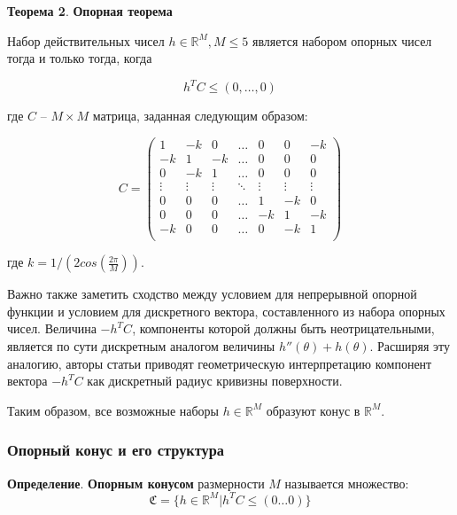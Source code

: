 \documentclass[a4paper,12pt, titlepage]{article}
\begin{document}
\begin{flushleft}
 \textbf{Теорема 2}. \textbf{Опорная теорема}

  Набор действительных чисел $h \in \mathbb{R}^{M}, M \leq 5$ является набором
  опорных чисел тогда и только тогда, когда
  
  $$h^{T} C \leq (0, \ldots, 0)$$
  
  где $C$ -- $M \times M$ матрица, заданная следующим образом:
  
  $$
  C = 
  \left(
  \begin{array}{ccccccc}
       1 &     -k &      0 & \ldots &      0 &      0 &     -k \\
      -k &      1 &     -k & \ldots &      0 &      0 &      0 \\
       0 &     -k &      1 & \ldots &      0 &      0 &      0 \\
  \vdots & \vdots & \vdots & \ddots & \vdots & \vdots & \vdots \\
       0 &      0 &      0 & \ldots &      1 &     -k &      0 \\
       0 &      0 &      0 & \ldots &     -k &      1 &     -k \\
      -k &      0 &      0 & \ldots &      0 &     -k &      1 \\
 \end{array}
 \right)
  $$
  
  где $k = 1 / (2 cos(\frac{2 \pi}{M}))$.

\end{flushleft}

Важно также заметить сходство между условием для непрерывной опорной функции и
условием для дискретного вектора, составленного из набора опорных чисел.
Величина $ - h^{T} C$, компоненты которой должны быть неотрицательными, является
по сути дискретным аналогом величины $h''(\theta) + h(\theta)$. Расширяя эту
аналогию, авторы статьи приводят геометрическую интерпретацию компонент вектора
$ - h^{T} C$ как дискретный радиус кривизны поверхности.

Таким образом, все возможные наборы $h \in \mathbb{R}^{M}$ образуют конус в
$\mathbb{R}^{M}$.

\subsubsection{Опорный конус и его структура}

\begin{flushleft}
 \textbf{Определение}. \textbf{Опорным конусом} размерности $M$ называется
 множество:
 $$
 \mathfrak{C} = \{h \in \mathbb{R}^{M} | h^{T} C \leq (0 \ldots 0) \}
 $$
\end{flushleft}
\end{document}
